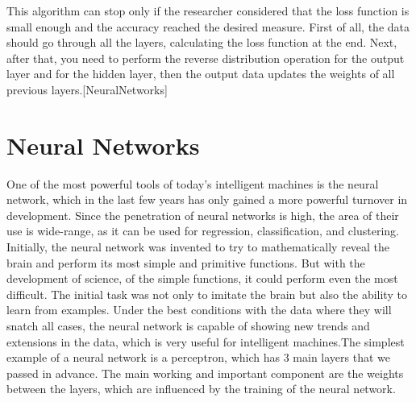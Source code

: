 \vspace{-0.5cm}
\noindent This algorithm can stop only if the researcher considered that the loss function is small enough and the accuracy reached the desired measure. First of all, the data should go through all the layers, calculating the loss function at the end. Next, after that, you need to perform the reverse distribution operation for the output layer and for the hidden layer, then the output data updates the weights of all previous layers.[NeuralNetworks]

\vspace{-0.3cm}




\section{Neural Networks}\label{sec:3.8}
\vspace{-0.5cm}
\noindent One of the most powerful tools of today's intelligent machines is the neural network, which in the last few years has only gained a more powerful turnover in development. Since the penetration of neural networks is high, the area of their use is wide-range, as it can be used for regression, classification, and clustering. Initially, the neural network was invented to try to mathematically reveal the brain and perform its most simple and primitive functions. But with the development of science, of the simple functions, it could perform even the most difficult. The initial task was not only to imitate the brain but also the ability to learn from examples. Under the best conditions with the data where they will snatch all cases, the neural network is capable of showing new trends and extensions in the data, which is very useful for intelligent machines.The simplest example of a neural network is a perceptron, which has 3 main layers that we passed in advance. The main working and important component are the weights between the layers, which are influenced by the training of the neural network.
